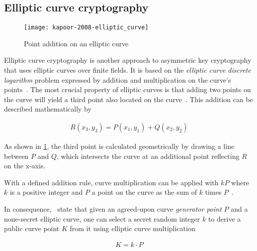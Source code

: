 \subsection{Elliptic curve cryptography}\label{subsec:elliptic-curve-cryptography}

\begin{figure}[H]
    \begin{center}
        \texttt{[image: kapoor-2008-elliptic\_curve]}
    \end{center}
    \caption[Point addition on an elliptic curve]{Point addition on an elliptic curve~\autocite[5]{kapoor_elliptic_2008}}
    \label{fig:elliptic-curve}
\end{figure}

Elliptic curve cryptography is another approach to asymmetric key cryptography that uses elliptic curves over finite fields.
It is based on the \emph{elliptic curve discrete logarithm} problem expressed by addition and multiplication on the curve's points~\autocites[65]{antonopoulos_mastering_2017}[5]{kapoor_elliptic_2008}.
The most crucial property of elliptic curves is that adding two points on the curve will yield a third point also located on the curve~\autocite[5]{kapoor_elliptic_2008}.
This addition can be described mathematically by

\begin{align}\label{eq:curve-addition}
    R(x_3,y_3)=P(x_1,y_1)+Q(x_2,y_2)
\end{align}

As shown in \cref{fig:elliptic-curve}, the third point is calculated geometrically by drawing a line between $P$ and $Q$, which intersects the curve at an additional point reflecting $R$ on the x-axis.

With a defined addition rule, curve multiplication can be applied with $kP$ where $k$ is a positive integer and $P$ a point on the curve as the sum of $k$ times $P$~\autocite[5]{kapoor_elliptic_2008}.

In consequence,~\textcites[65,68]{antonopoulos_mastering_2017}[5]{kapoor_elliptic_2008} state that given an agreed-upon curve \emph{generator point} $P$ and a none-secret elliptic curve, one can select a secret random integer $k$ to derive a public curve point $K$ from it using elliptic curve multiplication

\begin{align}\label{eq:curve-multiplication}
    K=k \cdot P
\end{align}

